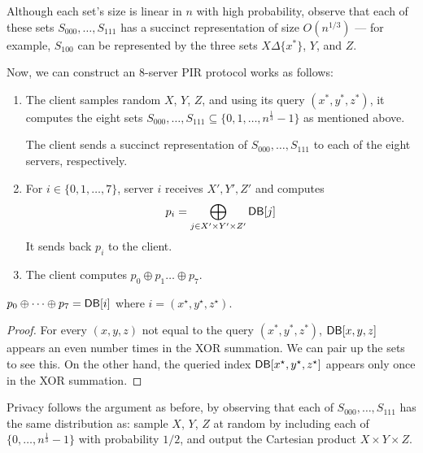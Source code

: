 Although each set's size is linear in $n$ with high probability, 
observe that each of these sets $S_{000}, \ldots, S_{111}$
has a succinct representation 
of size $O(n^{1/3})$ --- for example,
$S_{100}$ can be represented
by the three sets $X \Delta \{x^*\}$, $Y$, and $Z$.

Now, we can construct an $8$-server PIR protocol works as follows:

\begin{enumerate}
\item 
The client samples random $X$, $Y$, $Z$, 
and using its query $(x^*, y^*, z^*)$, it 
computes the 
eight sets $S_{000}, \ldots, S_{111} \subseteq \{0, 1, \ldots, 
n^{\frac13}-1\}$ as mentioned above.

The client sends 
a succinct representation of 
$S_{000}, \ldots, S_{111}$ to each of the eight 
servers, respectively.
\item 
For $i\in \{0, 1, \ldots, 7\}$, server $i$ 
receives $X', Y', Z'$
and computes 
\[p_{i} = \bigoplus_{j \in X' \times Y' \times Z'} {\sf DB}[j]\]
It sends back $p_i$ to the client.
\item 
The client computes $p_0 \oplus p_1 \ldots \oplus p_7$.
\end{enumerate}




\begin{claim} 
$p_0 \oplus \dots \oplus p_7 = {\sf DB}[i]$ 
where 
$i = (x^\star, y^\star, z^\star)$.
\end{claim}
		\begin{proof}
For every $(x,y,z)$ not equal to the query $(x^*, y^*, z^*)$, 
${\sf DB}[x, y, z]$ appears an even number times in the XOR summation. 
We can pair up the sets to see this. 
On the other hand, the queried index
 ${\sf DB}[x^\star, y^\star, z^\star]$ appears only once in the 
XOR summation.
		\end{proof}

		Privacy follows the argument as before, by observing
that each of 
$S_{000}, \ldots, S_{111}$
has the same distribution as:
sample $X$, $Y$, $Z$  
at random 
by including each of $\{0, \ldots, n^{\frac13}-1\}$
with probability $1/2$, 
and output the Cartesian product $X \times Y \times Z$.

